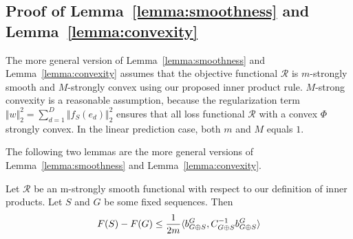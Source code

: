 \subsection{Proof of Lemma~\ref{lemma:smoothness} and Lemma~\ref{lemma:convexity}}

The more general version of Lemma~\ref{lemma:smoothness} and Lemma~\ref{lemma:convexity} assumes that the objective functional $\mathcal{R}$ 
is $m$-strongly smooth and $M$-strongly convex using our proposed inner product rule.  
$M$-strong convexity is a reasonable assumption, 
because the regularization term $\Vert w \Vert _2^2 = \sum _{d = 1}^D \Vert f_S(e_d) \Vert _2^2$ ensures that all loss functional $\mathcal{R}$ with a convex $\Phi$ 
 strongly convex. 
In the linear prediction case, both $m$ and $M$ equals $1$. 

The following two lemmas are the more general versions of Lemma~\ref{lemma:smoothness} and Lemma~\ref{lemma:convexity}.
\begin{lemma}
  Let $\mathcal{R}$ be an m-strongly smooth functional with respect to our definition of inner products. Let $S$ and $G$ be some fixed sequences. Then
  \begin{align}
   F(S) - F(G) \notag \leq \frac{1}{2m} \langle b^G_{G \oplus S}, C_{G \oplus S}^{-1} b^G_{G\oplus S} \rangle
  \end{align}
  \label{lemma:smoothness_glm}
\end{lemma}
